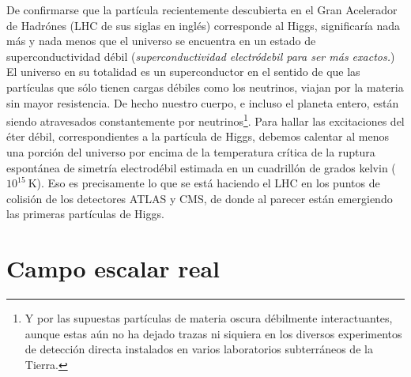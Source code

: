 De confirmarse que la partícula recientemente descubierta en el Gran Acelerador de Hadrónes (LHC de sus siglas en inglés) corresponde al Higgs, significaría nada más y nada menos que el universo se encuentra en un estado de superconductividad débil (\emph{superconductividad electródebil para ser más exactos.}) El universo en su totalidad es un superconductor en el sentido de que las partículas que sólo tienen cargas débiles como los neutrinos, viajan por la materia sin mayor resistencia. De hecho nuestro cuerpo, e incluso el planeta entero, están siendo atravesados constantemente por neutrinos\footnote{Y por las supuestas partículas de materia oscura débilmente interactuantes, aunque estas aún no ha dejado trazas ni siquiera en los diversos experimentos de detección directa instalados en varios laboratorios subterráneos de la Tierra.}. Para hallar las excitaciones del éter débil, correspondientes a la partícula de Higgs, debemos calentar al menos una porción del universo por encima de la temperatura crítica de la ruptura espontánea de simetría electrodébil estimada en un cuadrillón de grados kelvin ($10^{15}\ $K). Eso es precisamente lo que se está haciendo el LHC en los puntos de colisión de los detectores ATLAS y CMS, de donde al parecer están emergiendo las primeras partículas de Higgs. 


\section{Campo escalar real}

